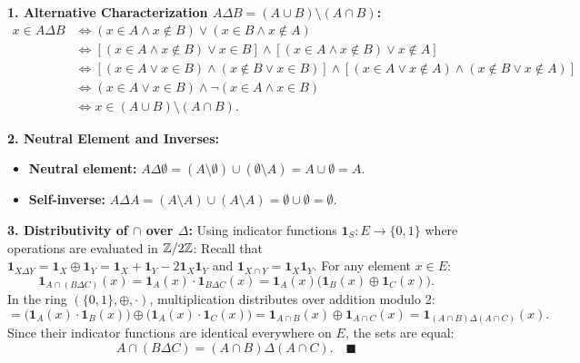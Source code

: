\begin{solution}
\textbf{1. Alternative Characterization $A \Delta B = (A \cup B) \setminus (A \cap B)$:}
\begin{align*}
x \in A \Delta B &\iff (x \in A \land x \notin B) \lor (x \in B \land x \notin A) \\
&\iff [(x \in A \land x \notin B) \lor x \in B] \land [(x \in A \land x \notin B) \lor x \notin A] \\
&\iff [(x \in A \lor x \in B) \land (x \notin B \lor x \in B)] \land [(x \in A \lor x \notin A) \land (x \notin B \lor x \notin A)] \\
&\iff (x \in A \lor x \in B) \land \neg(x \in A \land x \in B) \\
&\iff x \in (A \cup B) \setminus (A \cap B).
\end{align*}

\textbf{2. Neutral Element and Inverses:}
\begin{itemize}[leftmargin=1.5em,itemsep=2pt]
  \item \textbf{Neutral element:} $A \Delta \emptyset = (A \setminus \emptyset) \cup (\emptyset \setminus A) = A \cup \emptyset = A$.
  \item \textbf{Self-inverse:} $A \Delta A = (A \setminus A) \cup (A \setminus A) = \emptyset \cup \emptyset = \emptyset$.
\end{itemize}

\textbf{3. Distributivity of $\cap$ over $\Delta$:}
Using indicator functions $\mathbf{1}_S: E \to \{0, 1\}$ where operations are evaluated in $\mathbb{Z}/2\mathbb{Z}$:
Recall that $\mathbf{1}_{X \Delta Y} = \mathbf{1}_X \oplus \mathbf{1}_Y = \mathbf{1}_X + \mathbf{1}_Y - 2\mathbf{1}_X\mathbf{1}_Y$ and $\mathbf{1}_{X \cap Y} = \mathbf{1}_X \mathbf{1}_Y$.
For any element $x \in E$:
\[
\mathbf{1}_{A \cap (B \Delta C)}(x) = \mathbf{1}_A(x) \cdot \mathbf{1}_{B \Delta C}(x) = \mathbf{1}_A(x) \bigl(\mathbf{1}_B(x) \oplus \mathbf{1}_C(x)\bigr).
\]
In the ring $(\{0, 1\}, \oplus, \cdot)$, multiplication distributes over addition modulo 2:
\[
= \bigl(\mathbf{1}_A(x) \cdot \mathbf{1}_B(x)\bigr) \oplus \bigl(\mathbf{1}_A(x) \cdot \mathbf{1}_C(x)\bigr) = \mathbf{1}_{A \cap B}(x) \oplus \mathbf{1}_{A \cap C}(x) = \mathbf{1}_{(A \cap B) \Delta (A \cap C)}(x).
\]
Since their indicator functions are identical everywhere on $E$, the sets are equal:
\[
A \cap (B \Delta C) = (A \cap B) \Delta (A \cap C). \quad \blacksquare
\]
\end{solution}

